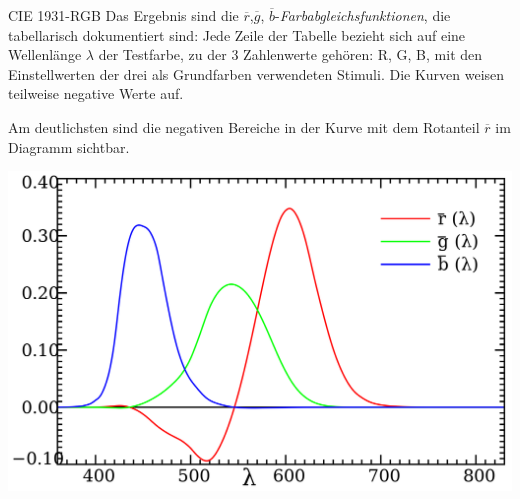 \begin{bonus}[Farbmodell]{CIE 1931-RGB}
    Das Ergebnis sind die $\overline{r}$,$\overline{g}$, $\overline{b}$-\emph{Farbabgleichsfunktionen}, die tabellarisch dokumentiert sind:
    Jede Zeile der Tabelle bezieht sich auf eine Wellenlänge $\lambda$ der Testfarbe, zu der 3 Zahlenwerte gehören: R, G, B, mit den Einstellwerten der drei als Grundfarben verwendeten Stimuli. Die Kurven weisen teilweise negative Werte auf.

    Am deutlichsten sind die negativen Bereiche in der Kurve mit dem Rotanteil $\overline{r}$ im Diagramm sichtbar.

    \centering
    \includegraphics[width=.7\linewidth]{figures/CIE1931_RGBCMF.svg.png}
\end{bonus}

